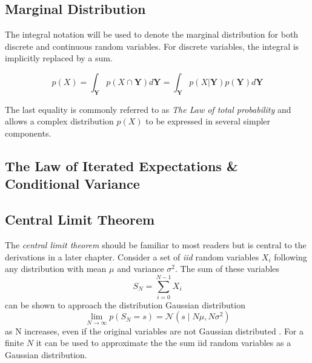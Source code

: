 \subsection{Marginal Distribution}
The integral notation will be used to denote the marginal distribution for both discrete and continuous random variables. For discrete variables, the integral is implicitly replaced by a sum.  

\begin{equation}
    p(X) = \int_{\boldsymbol{Y}} p(X \cap \boldsymbol{Y}) d\boldsymbol{Y} = \int_{\boldsymbol{Y}} p(X | \boldsymbol{Y}) p(\boldsymbol{Y}) d\boldsymbol{Y}
\end{equation}

The last equality is commonly referred to as \textit{The Law of total probability} and allows a complex distribution $p(X)$ to be expressed in several simpler components.

\subsection{The Law of Iterated Expectations \& Conditional Variance}

\subsection{Central Limit Theorem}\label{sec:clt}
The \textit{central limit theorem} should be familiar to most readers but is central to the derivations in a later chapter. Consider a set of \textit{\acrfull{iid}} random variables $X_i$ following any distribution with mean $\mu$ and variance $\sigma^2$. The sum of these variables 
\begin{equation}
    S_N = \sum_{i=0}^{N-1} X_i
\end{equation} 
can be shown to approach the distribution Gaussian distribution
\begin{equation}
    \lim_{N \to \infty} p(S_N=s) = \mathcal{N}(s \; | \; N \mu, N\sigma^2)
\end{equation}
as N increases, even if the original variables are not Gaussian distributed \cite{murphy}. For a finite $N$ it can be used to approximate the the sum \acrshort{iid} random variables as a Gaussian distribution.

